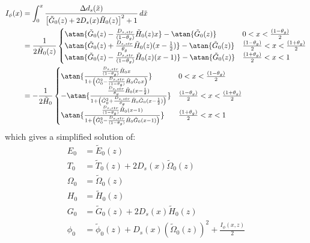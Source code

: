 \begin{equation}
\begin{split}
I_{\phi}(x) &= \int_{0}^{x}\frac{\Delta d_s(\tilde{x})}{\left[\tilde{G}_0(z) + 2 D_s(x) \tilde{H}_0(z)\right]^2 +1} \,d\tilde{x} \\
 &= \frac{1}{2\tilde{H}_0(z)} \begin{cases} 
\atan{\tilde{G}_0(z) - \frac{D_{s,str}}{(1-\theta_g)}\tilde{H}_0(z) x} -\atan{\tilde{G}_0(z)}  & 0 < x < \frac{(1- \theta_{g})}{2} \\
\atan{\tilde{G}_0(z) + \frac{D_{s,str}}{\theta_g}\tilde{H}_0(z) (x-\frac{1}{2})} -\atan{\tilde{G}_0(z)}    & \frac{(1- \theta_{g})}{2} < x < \frac{(1+ \theta_{g})}{2}  \\
\atan{\tilde{G}_0(z) - \frac{D_{s,str}}{(1-\theta_g)}\tilde{H}_0(z) (x-1)} -\atan{\tilde{G}_0(z)} &  \frac{(1+ \theta_{g})}{2}  < x < 1
\end{cases}\\
 &= -\frac{1}{2\tilde{H}_0} \begin{cases}
 \atan{\frac{\frac{D_{s,str}}{(1-\theta_g)}\tilde{H}_0 x}{1+\left(\tilde{G}_0^2-\frac{D_{s,str}}{(1-\theta_g)}\tilde{H}_0\tilde{G}_0 x\right)}}  & 0 < x < \frac{(1- \theta_{g})}{2} \\
-\atan{\frac{\frac{D_{s,str}}{\theta_g}\tilde{H}_0 (x-\frac{1}{2})}{1+\left(\tilde{G}_0^2+\frac{D_{s,str}}{\theta_g}\tilde{H}_0\tilde{G}_0 (x-\frac{1}{2})\right)}}    & \frac{(1- \theta_{g})}{2} < x < \frac{(1+ \theta_{g})}{2}  \\
\atan{\frac{\frac{D_{s,str}}{(1-\theta_g)}\tilde{H}_0 (x-1)}{1+\left(\tilde{G}_0^2-\frac{D_{s,str}}{(1-\theta_g)}\tilde{H}_0\tilde{G}_0 (x-1)\right)}}    &  \frac{(1+ \theta_{g})}{2}  < x < 1 
\end{cases}
\end{split}
\end{equation}
which gives a simplified solution of:
\begin{equation}
\begin{split}
E_0 &= \tilde{E}_0(z) \\
T_0 &= \tilde{T}_0(z) + 2 D_s(x) \tilde{\Omega}_0(z) \\
\Omega_0 &= \tilde{\Omega}_0(z)\\ 
H_0 &= \tilde{H}_0(z)\\
G_0 &= \tilde{G}_0(z) + 2 D_s(x) \tilde{H}_0(z)\\ 
\phi_0 & =\tilde{\phi}_0(z) +  D_s(x)\left(\tilde{\Omega}_0(z)\right)^2 + \frac{I_{\phi}(x,z)}{2}  \\
\end{split}
\end{equation}


